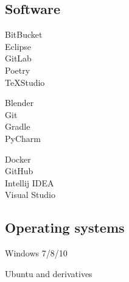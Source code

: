 \documentclass[curriculum-vitae-eng]{subfiles}
\begin{document}
		\subsection*{Software}
			\begin{minipage}[t]{.3\textwidth}
				BitBucket \hfill {}\\
				Eclipse \hfill {}\\
				GitLab \hfill {}\\
				Poetry \hfill {}\\
				\TeX Studio \hfill {}\\
			\end{minipage}
			\hfill
			\begin{minipage}[t]{.3\textwidth}
				Blender \hfill {}\\
				Git \hfill {}\\
				Gradle \hfill {}\\
				PyCharm \hfill {}\\
			\end{minipage}
			\hfill
			\begin{minipage}[t]{.3\textwidth}
				Docker \hfill {}\\
				GitHub \hfill {}\\
				Intellij IDEA \hfill {}\\
				Visual Studio \hfill {}\\
			\end{minipage}
		
		\subsection*{Operating systems}
			\begin{minipage}[t]{.45\textwidth}
				Windows 7/8/10 \hfill {}\\
			\end{minipage}
			\hfill
			\begin{minipage}[t]{.45\textwidth}
				Ubuntu and derivatives \hfill {}\\
			\end{minipage}
		
\end{document}
